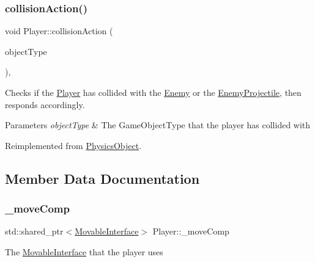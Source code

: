 \subsubsection{\texorpdfstring{collision\+Action()}{collisionAction()}}
{\footnotesize\ttfamily void Player\+::collision\+Action (\begin{DoxyParamCaption}\item[{const Game\+Object\+Type \&}]{object\+Type }\end{DoxyParamCaption})\hspace{0.3cm}{\ttfamily [override]}, {\ttfamily [virtual]}}



Checks if the \hyperlink{class_player}{Player} has collided with the \hyperlink{class_enemy}{Enemy} or the \hyperlink{class_enemy_projectile}{Enemy\+Projectile}, then responds accordingly. 


\begin{DoxyParams}{Parameters}
{\em object\+Type} & The Game\+Object\+Type that the player has collided with \\
\hline
\end{DoxyParams}


Reimplemented from \hyperlink{class_physics_object_a16163f4e5bf781b3814d024c9f44a276}{Physics\+Object}.



\subsection{Member Data Documentation}
\mbox{\label{class_player_a6823a96878a4eadeb1ee6e6a31381ccd}} 
\subsubsection{\texorpdfstring{\+\_\+move\+Comp}{\_moveComp}}
{\footnotesize\ttfamily std\+::shared\+\_\+ptr$<$\hyperlink{class_movable_interface}{Movable\+Interface}$>$ Player\+::\+\_\+move\+Comp\hspace{0.3cm}{\ttfamily [private]}}

The \hyperlink{class_movable_interface}{Movable\+Interface} that the player uses \mbox{\label{class_player_af8bc99499c9a085235de04e04e4b7689}} 
